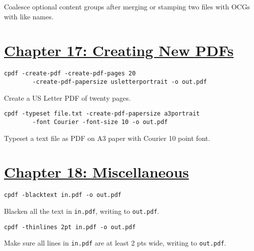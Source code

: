 \documentclass{book}
\begin{document}
\noindent Coalesce optional content groups after merging or stamping two files with OCGs with like names.

\section*{\hyperref[chap:17]{Chapter 17: Creating New PDFs}}

\begin{framed}
 \small\verb?cpdf -create-pdf -create-pdf-pages 20?\\
 \noindent\small\verb?        -create-pdf-papersize usletterportrait -o out.pdf?
\end{framed}

\noindent Create a US Letter PDF of twenty pages.

\begin{framed}
 \small\verb?cpdf -typeset file.txt -create-pdf-papersize a3portrait?\\
 \noindent\small\verb?        -font Courier -font-size 10 -o out.pdf?
\end{framed}

\noindent Typeset a text file as PDF on A3 paper with Courier 10 point font.


\section*{\hyperref[chap:misc]{Chapter 18: Miscellaneous}}

\begin{framed}\noindent\texttt{cpdf -blacktext in.pdf -o out.pdf}\end{framed}

\noindent Blacken all the text in \texttt{in.pdf}, writing to \texttt{out.pdf}.

\begin{framed}\noindent\texttt{cpdf -thinlines 2pt in.pdf -o out.pdf}\end{framed}

\noindent Make sure all lines in \texttt{in.pdf} are at least 2 pts wide, writing to \texttt{out.pdf}.
\pagestyle{empty}
\cleardoublepage
\end{document}
